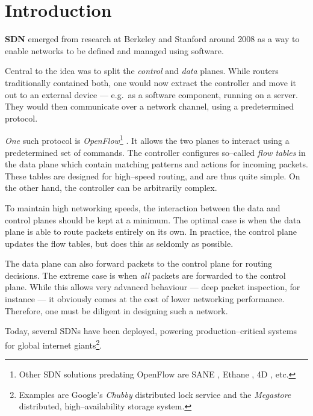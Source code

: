 \chapter{Introduction}

\textbf{\acf{SDN}} \cite{Casado:2005:VNS:1047344.1047383} emerged from
research at Berkeley and Stanford around 2008 as a way to enable networks to
be defined and managed using software.

Central to the idea was to split the {\em control} and {\em data} planes.
While routers traditionally contained both, one would now extract the
controller and move it out to an external device --- e.g.~as a software
component, running on a server.  They would then communicate over a network
channel, using a predetermined protocol.

{\em One} such protocol is {\em OpenFlow}\footnote{Other
\ac{SDN} solutions predating OpenFlow are SANE
\cite{Casado:2006:SPA:1267336.1267346}, Ethane
\cite{Casado:2007:ETC:1282427.1282382}, 4D
\cite{Greenberg:2005:CSA:1096536.1096541}, etc.}
\cite{McKeown:2008:OEI:1355734.1355746}.  It allows the two planes to
interact using a predetermined set of commands.  The controller configures
so--called {\em flow tables} in the data plane  which contain matching patterns and actions for incoming packets.
These tables are designed for high--speed routing, and are thus quite
simple.  On the other hand, the controller can be arbitrarily complex.

To maintain high networking speeds, the interaction between the data and
control planes should be kept at a minimum.  The optimal case is when the
data plane is able to route packets entirely on its own.  In practice, the
control plane updates the flow tables, but does this as seldomly as
possible.

The data plane can also forward packets to the control plane for routing decisions. The extreme case is when {\em all} packets are
forwarded to the control plane.  While this allows very advanced behaviour
--- deep packet inspection, for instance --- it obviously comes at the cost
of lower networking performance.  Therefore, one must be diligent in
designing such a network.

Today, several \acp{SDN} have been deployed, powering production--critical
systems for global internet giants\footnote{Examples are
Google's {\em Chubby} distributed lock
service and the {\em Megastore}
distributed, high--availability storage system.}.

